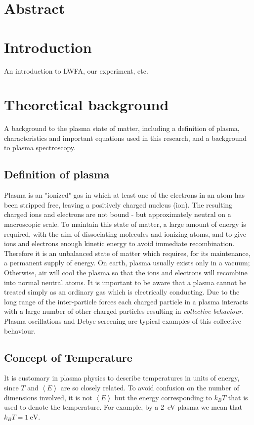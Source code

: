 \documentclass[justified,nofonts,nobib]{tufte-book}
\begin{document}
	\chapter{Abstract}\label{chap:abstract}
	\chapter{Introduction}\label{chap:intro}
	An introduction to LWFA, our experiment, etc.
	\chapter{Theoretical background}\label{chap:background}
	A background to the plasma state of matter, including a definition of plasma, characteristics and important equations used in this research, and a background to plasma spectroscopy.
	\section{Definition of plasma}
Plasma is an "ionized" gas in which at least one of the electrons in an atom has been stripped free, leaving a positively charged nucleus (ion). The resulting charged ions and electrons are not bound - but approximately neutral on a macroscopic scale. To maintain this state of matter, a large amount of energy is required, with the aim of dissociating molecules and ionizing atoms, and to give ions and electrons enough kinetic energy to avoid immediate recombination. Therefore it is an unbalanced state of matter which requires, for its maintenance, a permanent supply of energy. On earth, plasma usually exists only in a vacuum; Otherwise, air will cool the plasma so that the ions and electrons will recombine into normal neutral atoms. It is important to be aware that a plasma cannot be treated simply as an ordinary gas which is electrically conducting. Due to the long range of the inter-particle forces each charged particle in a plasma interacts with a large number of other charged particles resulting in \emph{collective behaviour}. Plasma oscillations and Debye screening are typical examples of this collective behaviour.
\section{Concept of Temperature}
It is customary in plasma physics to describe temperatures in units of energy, since $T$ and $\left<E\right>$ are so closely related. To avoid confusion on the number of dimensions involved, it is not $\left<E\right>$ but the energy corresponding to $k_B T$ that is used to denote the temperature. For example, by a \SI{2}{\electronvolt} plasma we mean that $k_B T = \SI{1}{\electronvolt}$.
\end{document}
